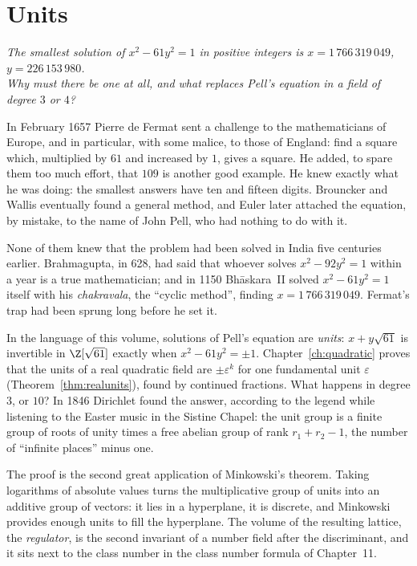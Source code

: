 \chapter{Units}
\begin{center}\itshape
The smallest solution of $x^2-61y^2=1$ in positive integers is $x=1\,766\,319\,049$, $y=226\,153\,980$.\\
Why must there be one at all, and what replaces Pell's equation in a field of degree $3$ or $4$?
\end{center}

In February 1657 Pierre de Fermat sent a challenge to the mathematicians of Europe, and in particular, with some malice,
to those of England: find a square which, multiplied by $61$ and increased by $1$, gives a square. He added, to spare
them too much effort, that $109$ is another good example. He knew exactly what he was doing: the smallest answers have
ten and fifteen digits. Brouncker and Wallis eventually found a general method, and Euler later attached the equation,
by mistake, to the name of John Pell, who had nothing to do with it.

None of them knew that the problem had been solved in India five centuries earlier. Brahmagupta, in 628, had said that
whoever solves $x^2-92y^2=1$ within a year is a true mathematician; and in 1150 Bh\=askara~II solved $x^2-61y^2=1$
itself with his \emph{chakravala}, the ``cyclic method'', finding $x=1\,766\,319\,049$. Fermat's trap had been sprung long
before he set it.

In the language of this volume, solutions of Pell's equation are \emph{units}: $x+y\sqrt{61}$ is invertible in $\Z[\sqrt{61}]$
exactly when $x^2-61y^2=\pm1$. Chapter~\ref{ch:quadratic} proves that the units of a real quadratic field are $\pm\varepsilon^k$ for one
fundamental unit $\varepsilon$ (Theorem~\ref{thm:realunits}), found by continued fractions. What happens in degree $3$, or $10$?
In 1846 Dirichlet found the answer, according to the legend while listening to the Easter music in the Sistine Chapel: the
unit group is a finite group of roots of unity times a free abelian group of rank $r_1+r_2-1$, the number of
``infinite places'' minus one.

The proof is the second great application of Minkowski's theorem. Taking logarithms of absolute values turns the
multiplicative group of units into an additive group of vectors: it lies in a hyperplane, it is discrete, and Minkowski
provides enough units to fill the hyperplane. The volume of the resulting lattice, the \emph{regulator}, is the second
invariant of a number field after the discriminant, and it sits next to the class number in the class number formula of
Chapter~11.


